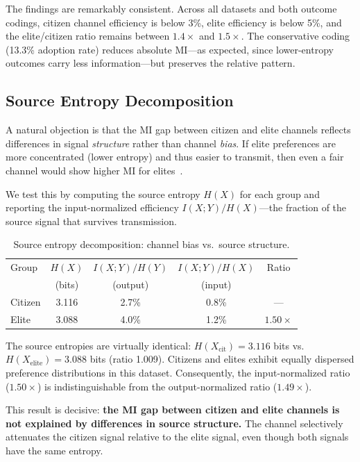 \documentclass[twocolumn,10pt]{article}
\begin{document}
The findings are remarkably consistent.  Across all datasets and both outcome codings, citizen channel efficiency is below 3\%, elite efficiency is below 5\%, and the elite/citizen ratio remains between $1.4\times$ and $1.5\times$.  The conservative coding (13.3\% adoption rate) reduces absolute MI---as expected, since lower-entropy outcomes carry less information---but preserves the relative pattern.

\subsection{Source Entropy Decomposition}

A natural objection is that the MI gap between citizen and elite channels reflects differences in signal \emph{structure} rather than channel \emph{bias}.  If elite preferences are more concentrated (lower entropy) and thus easier to transmit, then even a fair channel would show higher MI for elites~\citep{cover2006}.

We test this by computing the source entropy $H(X)$ for each group and reporting the input-normalized efficiency $I(X;Y)/H(X)$---the fraction of the source signal that survives transmission.

\begin{table}[t]
\centering
\caption{Source entropy decomposition: channel bias vs.\ source structure.}
\label{tab:source}
\begin{tabular}{@{}lcccc@{}}
\toprule
Group & $H(X)$ & $I(X;Y)/H(Y)$ & $I(X;Y)/H(X)$ & Ratio \\
 & (bits) & (output) & (input) & \\
\midrule
Citizen & 3.116 & 2.7\% & 0.8\% & --- \\
Elite & 3.088 & 4.0\% & 1.2\% & $1.50\times$ \\
\bottomrule
\end{tabular}
\end{table}

The source entropies are virtually identical: $H(X_\text{cit}) = 3.116$ bits vs.\ $H(X_\text{elite}) = 3.088$ bits (ratio 1.009).  Citizens and elites exhibit equally dispersed preference distributions in this dataset.  Consequently, the input-normalized ratio ($1.50\times$) is indistinguishable from the output-normalized ratio ($1.49\times$).

This result is decisive: \textbf{the MI gap between citizen and elite channels is not explained by differences in source structure.}  The channel selectively attenuates the citizen signal relative to the elite signal, even though both signals have the same entropy.
\end{document}
